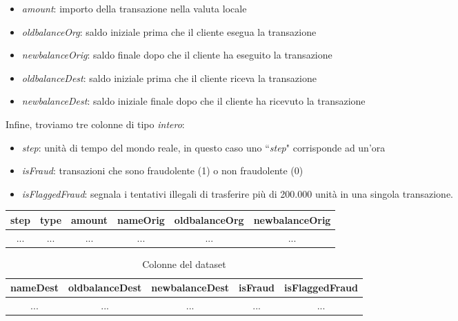 \begin{itemize}

\item \textit{amount}: importo della transazione nella valuta locale
\item \textit{oldbalanceOrg}: saldo iniziale prima che il cliente esegua la transazione 
\item \textit{newbalanceOrig}: saldo finale dopo che il cliente ha eseguito la transazione 
\item \textit{oldbalanceDest}: saldo iniziale prima che il cliente riceva la transazione 
\item \textit{newbalanceDest}: saldo iniziale finale dopo che il cliente ha ricevuto la transazione 

\end{itemize}

\noindent Infine, troviamo tre colonne di tipo \textit{intero}:

\begin{itemize}
\item \textit{step}: unità di tempo del mondo reale, in questo caso uno ``\textit{step}" corrisponde ad un'ora
\item \textit{isFraud}: transazioni che sono fraudolente (1) o non fraudolente (0)
\item \textit{isFlaggedFraud}: segnala i tentativi illegali di trasferire più di 200.000 unità in una singola transazione.\\

\end{itemize}

\begin{table}[H] %
\centering
\begin{tabular}{|c|c|c|c|c|c|} \hline
step & type & amount & nameOrig & oldbalanceOrg & newbalanceOrig \\ \hline
  ... & ...  & ... & ...  & ... & ... \\ \hline
\end{tabular}
\label{tab:primo}
\end{table}

\begin{table}[H] %
\centering
\begin{tabular}{|c|c|c|c|c|} \hline
nameDest & oldbalanceDest & newbalanceDest & isFraud & isFlaggedFraud \\ \hline
... & ... & ... & ... & ... \\ \hline
\end{tabular}
\caption{Colonne del dataset}
\label{tab:secondo}
\end{table}


